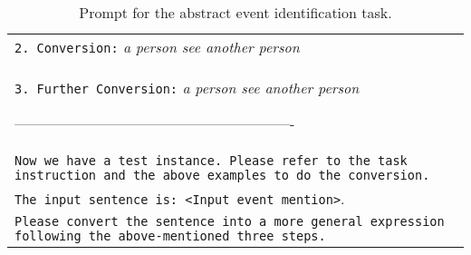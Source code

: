 \begin{table*}[]
\begin{tabular}{p{14cm}}
\texttt{2. Conversion:} \textit{a person see another person} \\

\texttt{3. Further Conversion:} \textit{a person see another person}


---------------------------------------------------------- \\
        


        



\texttt{Now we have a test instance. Please refer to the task instruction and the above examples to do the conversion.} \\
\texttt{The input sentence is: <Input event mention>}.\\
\texttt{Please convert the sentence into a more general expression following the above-mentioned three steps.}\\ 
\bottomrule

    \end{tabular}
    \caption{Prompt for the abstract event identification task.}
    \label{tab:prompt_abs}
\end{table*}
